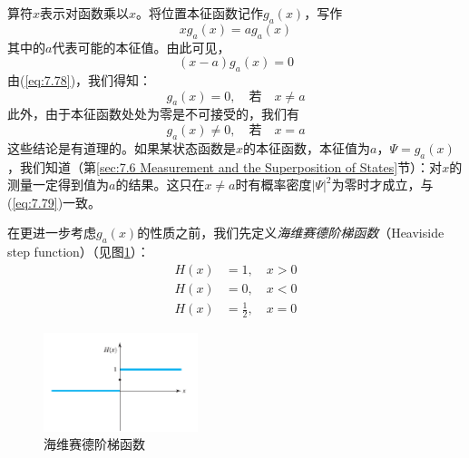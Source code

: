     算符$\hat{x}$表示对函数乘以$x$。将位置本征函数记作$g_a\left(x\right)$，写作
    \begin{equation}
        xg_a\left(x\right) = a g_a\left(x\right)
        \label{eq:7.77}
    \end{equation}
    其中的$a$代表可能的本征值。由此可见，
    \begin{equation}
        \left(x-a\right)g_a\left(x\right) = 0
        \label{eq:7.78}
    \end{equation}
    由(\ref{eq:7.78})，我们得知：
    \begin{equation}
        g_a\left(x\right) = 0, \quad \text{若} \quad x \neq a
        \label{eq:7.79}
    \end{equation}
    此外，由于本征函数处处为零是不可接受的，我们有
    \begin{equation}
        g_a\left(x\right) \neq 0, \quad \text{若} \quad x = a
        \label{eq:7.80}
    \end{equation}
    这些结论是有道理的。如果某状态函数是$\hat{x}$的本征函数，本征值为$a$，$\Psi = g_a\left(x\right)$，我们知道（第\ref{sec:7.6 Measurement and the Superposition of States}节）：对$x$的测量一定得到值为$a$的结果。这只在$x \neq a$时有概率密度$\left|\Psi\right|^2$为零时才成立，与(\ref{eq:7.79})一致。

    在更进一步考虑$g_a\left(x\right)$的性质之前，我们先定义\textit{海维赛德阶梯函数}（Heaviside step function）（见图\ref{fig:7.4}）：
    \begin{equation}
        \begin{aligned}
            H\left(x\right) & = 1, \quad x > 0 \\
            H\left(x\right) & = 0, \quad x < 0 \\
            H\left(x\right) & = \frac{1}{2}, \quad x = 0
        \end{aligned}
        \label{eq:7.81}
    \end{equation}
    \begin{figure}[ht]
        \centering
        \includegraphics[width=0.4\textwidth]{Figures/7.4.png}
        \caption{海维赛德阶梯函数}
        \label{fig:7.4}
    \end{figure}

